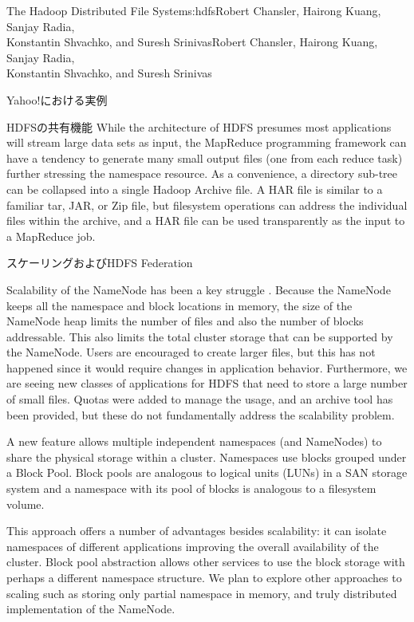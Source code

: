 \begin{aosachaptertoc}{The Hadoop Distributed File System}{s:hdfs}{Robert Chansler, Hairong Kuang, Sanjay Radia, \\ Konstantin Shvachko, and Suresh Srinivas}{Robert Chansler, Hairong Kuang, Sanjay Radia, \\ \hspace*{0.9cm} Konstantin Shvachko, and Suresh Srinivas}
\begin{aosasect1}{Yahoo!における実例}
\begin{aosasect2}{HDFSの共有機能}
While the architecture of HDFS presumes most applications will stream
large data sets as input, the MapReduce programming framework can have
a tendency to generate many small output files (one from each reduce
task) further stressing the namespace resource. As a convenience, a
directory sub-tree can be collapsed into a single Hadoop Archive
file. A HAR file is similar to a familiar tar, JAR, or Zip file, but
filesystem operations can address the individual files within the
archive, and a HAR file can be used transparently as the input to a
MapReduce job.

\end{aosasect2}

\begin{aosasect2}{スケーリングおよびHDFS Federation}

Scalability of the NameNode has been a key struggle
\cite{bib:shvachko:hdfs}.  Because the NameNode keeps all the
namespace and block locations in memory, the size of the NameNode heap
limits the number of files and also the number of blocks
addressable. This also limits the total cluster storage that can be
supported by the NameNode. Users are encouraged to create larger
files, but this has not happened since it would require changes in
application behavior. Furthermore, we are seeing new classes of
applications for HDFS that need to store a large number of small
files. Quotas were added to manage the usage, and an archive tool has
been provided, but these do not fundamentally address the
scalability problem.

A new feature allows multiple independent namespaces (and NameNodes)
to share the physical storage within a cluster. Namespaces use blocks
grouped under a Block Pool. Block pools are analogous to logical units (LUNs) in a SAN
storage system and a namespace with its pool of blocks is analogous to
a filesystem volume.

This approach offers a number of advantages besides scalability: it
can isolate namespaces of different applications improving the overall
availability of the cluster. Block pool abstraction allows other
services to use the block storage with perhaps a different namespace
structure. We plan to explore other approaches to scaling such as
storing only partial namespace in memory, and truly distributed
implementation of the NameNode.


\end{aosasect2}
\end{aosasect1}
\end{aosachaptertoc}
